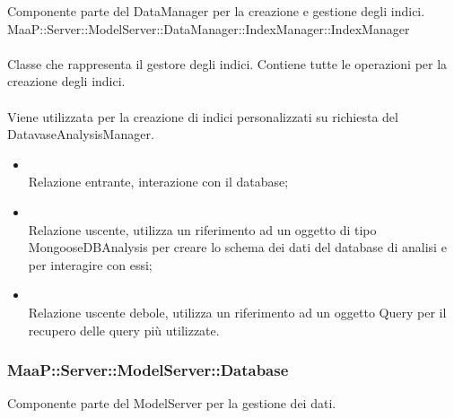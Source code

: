 Componente parte del DataManager per la creazione e gestione degli indici.
	\\
	MaaP::Server::ModelServer::DataManager::IndexManager::IndexManager\\
	\\
	Classe che rappresenta il gestore degli indici. Contiene tutte le operazioni per la creazione degli indici.\\
	\\
	Viene utilizzata per la creazione di indici personalizzati su richiesta del DatavaseAnalysisManager.\\
	\begin{itemize}
	\item{}\\
	Relazione entrante, interazione con il database;
	\item{}\\
	Relazione uscente, utilizza un riferimento ad un oggetto di tipo MongooseDBAnalysis per creare lo schema dei dati del database di analisi e per interagire con essi;
	\item{}\\
	Relazione uscente debole, utilizza un riferimento ad un oggetto Query per il recupero delle query più utilizzate.
	\end{itemize}

\subsubsection{MaaP::Server::ModelServer::Database}
Componente parte del ModelServer per la gestione dei dati.

